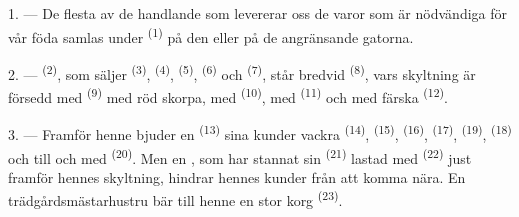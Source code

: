 %

\VUsaut{4.0mm}
\VUsaut{3.0mm}

\VUsaut{3.0mm}

1. --- De flesta av de handlande som levererar oss de varor som är nödvändiga för vår föda
samlas under  \textsuperscript{(1)} på den
 eller på de angränsande gatorna.

2. ---  \textsuperscript{(2)}, som säljer 
\textsuperscript{(3)},  \textsuperscript{(4)},
 \textsuperscript{(5)},  \textsuperscript{(6)} och
 \textsuperscript{(7)}, står bredvid  \textsuperscript{(8)}, vars skyltning är försedd med
 \textsuperscript{(9)} med röd skorpa, med
 \textsuperscript{(10)}, med 
\textsuperscript{(11)} och med färska  \textsuperscript{(12)}.

3. --- Framför henne bjuder en  \textsuperscript{(13)} sina
kunder vackra  \textsuperscript{(14)}, 
\textsuperscript{(15)},
 \textsuperscript{(16)}, 
\textsuperscript{(17)},  \textsuperscript{(19)},
 \textsuperscript{(18)} och till och med 
\textsuperscript{(20)}. Men en , som har stannat sin
 \textsuperscript{(21)} lastad med 
\textsuperscript{(22)} just framför hennes skyltning, hindrar hennes kunder från att komma
nära. En trädgårdsmästarhustru bär till henne en stor korg
 \textsuperscript{(23)}.

